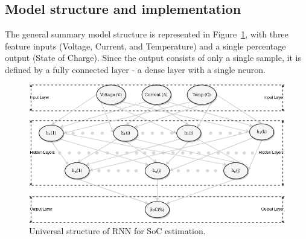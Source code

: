 \subsection{Model structure and implementation} \label{subsec:structure}
The general summary model structure is represented in \mbox{Figure~\ref{fig:RNN-structure}}, with three feature inputs (Voltage, Current, and Temperature) and a single percentage output (State of Charge).
Since the output consists of only a single sample, it is defined by a fully connected layer - a dense layer with a single neuron.
\begin{figure}[htbp]
    \centering
    \includegraphics[width=\columnwidth]{II_Body/images/SoC-RNN.png}
    \caption{Universal structure of RNN for SoC estimation.}
    \label{fig:RNN-structure}
\end{figure}

